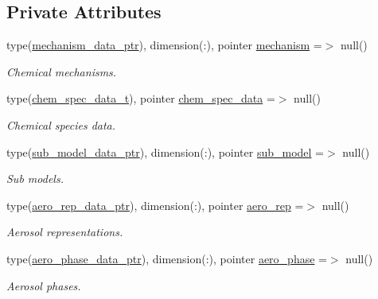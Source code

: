 \subsection*{Private Attributes}
\begin{DoxyCompactItemize}
\item 
type(\mbox{\hyperlink{structpmc__mechanism__data_1_1mechanism__data__ptr}{mechanism\+\_\+data\+\_\+ptr}}), dimension(\+:), pointer \mbox{\hyperlink{structpmc__phlex__core_1_1phlex__core__t_a1571c7b93b74bfc06016afbbd98f031e}{mechanism}} =$>$ null()
\begin{DoxyCompactList}\small\item\em Chemical mechanisms. \end{DoxyCompactList}\item 
type(\mbox{\hyperlink{structpmc__chem__spec__data_1_1chem__spec__data__t}{chem\+\_\+spec\+\_\+data\+\_\+t}}), pointer \mbox{\hyperlink{structpmc__phlex__core_1_1phlex__core__t_aff3bb5cb12638af6de6ee3b8b65a1fb3}{chem\+\_\+spec\+\_\+data}} =$>$ null()
\begin{DoxyCompactList}\small\item\em Chemical species data. \end{DoxyCompactList}\item 
type(\mbox{\hyperlink{structpmc__sub__model__data_1_1sub__model__data__ptr}{sub\+\_\+model\+\_\+data\+\_\+ptr}}), dimension(\+:), pointer \mbox{\hyperlink{structpmc__phlex__core_1_1phlex__core__t_a4e0081099dd1d59ae0722d60260447b0}{sub\+\_\+model}} =$>$ null()
\begin{DoxyCompactList}\small\item\em Sub models. \end{DoxyCompactList}\item 
type(\mbox{\hyperlink{structpmc__aero__rep__data_1_1aero__rep__data__ptr}{aero\+\_\+rep\+\_\+data\+\_\+ptr}}), dimension(\+:), pointer \mbox{\hyperlink{structpmc__phlex__core_1_1phlex__core__t_a1228d9facb6bdb34bf401b7d946a16f0}{aero\+\_\+rep}} =$>$ null()
\begin{DoxyCompactList}\small\item\em Aerosol representations. \end{DoxyCompactList}\item 
type(\mbox{\hyperlink{structpmc__aero__phase__data_1_1aero__phase__data__ptr}{aero\+\_\+phase\+\_\+data\+\_\+ptr}}), dimension(\+:), pointer \mbox{\hyperlink{structpmc__phlex__core_1_1phlex__core__t_a36e8ce5078423a0d2abdd279b1941b9d}{aero\+\_\+phase}} =$>$ null()
\begin{DoxyCompactList}\small\item\em Aerosol phases. \end{DoxyCompactList}\item 

\end{DoxyCompactItemize}
